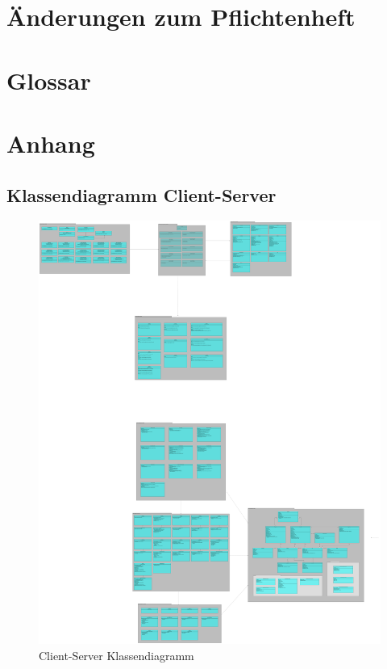 \documentclass[a4paper]{scrreprt}
\begin{document}
\chapter{Änderungen zum Pflichtenheft}

\chapter{Glossar}

\chapter{Anhang}
\section{Klassendiagramm Client-Server}
 \begin{figure}[H]
	       \centering
	       \includegraphics[scale = .05]{client_server_klassen.png}
	       \caption{Client-Server Klassendiagramm}
	      \end{figure}
\end{document}
